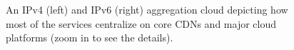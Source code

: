 \begin{figure}[t]
  \begin{minipage}[t]{0.50\textwidth}
    \centering
  \end{minipage}
  \begin{minipage}[t]{0.50\textwidth}
    \centering
  \end{minipage}
  \caption{\label{fig:v4-v6-cloud}An IPv4 (left) and IPv6 (right) aggregation
  cloud depicting how most of the services centralize on core \ac{CDN}s and
  major cloud platforms (zoom in to see the details).}
\end{figure}

